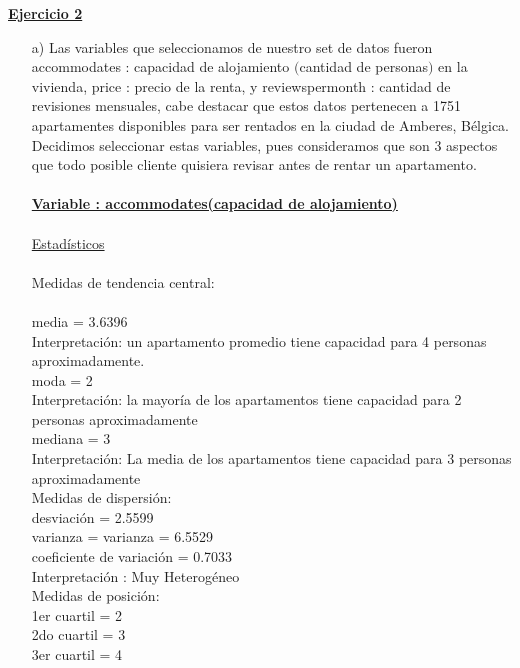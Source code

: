 \documentclass[a4paper,12pt]{article}
\begin{document}
\textbf{\large\underline{Ejercicio 2}}\\
\begin{enumerate}
    \item [a)] Las variables que seleccionamos de nuestro set de datos fueron accommodates : capacidad de alojamiento $($cantidad de personas$)$ en la vivienda,
price : precio de la renta, y reviews\textunderscore per\textunderscore month : cantidad de revisiones mensuales, cabe destacar que estos datos pertenecen a 1751 apartamentes disponibles
para ser rentados en la ciudad de Amberes, B\'elgica. Decidimos seleccionar estas variables, pues consideramos que son 3 aspectos que todo posible cliente quisiera
revisar antes de rentar un apartamento.\\\\

\textbf{\underline{Variable : accommodates(capacidad de alojamiento)}}\\\\
\underline{Estad\'isticos}\\\\
Medidas de tendencia central:\\\\
media = 3.6396\\
Interpretaci\'on: un apartamento promedio tiene capacidad para 4 personas aproximadamente.\\
moda = 2\\
Interpretaci\'on: la mayor\'ia de los apartamentos tiene capacidad para 2 personas aproximadamente\\
mediana = 3\\
Interpretaci\'on: La media de los apartamentos tiene capacidad para 3 personas aproximadamente\\

Medidas de dispersi\'on:\\
desviaci\'on = 2.5599\\
varianza = varianza = 6.5529\\
coeficiente de variaci\'on = 0.7033\\
Interpretaci\'on : Muy Heterog\'eneo\\

Medidas de posici\'on:\\
1er cuartil = 2\\
2do cuartil = 3\\
3er cuartil = 4\\\\


\end{enumerate}
\end{document}
